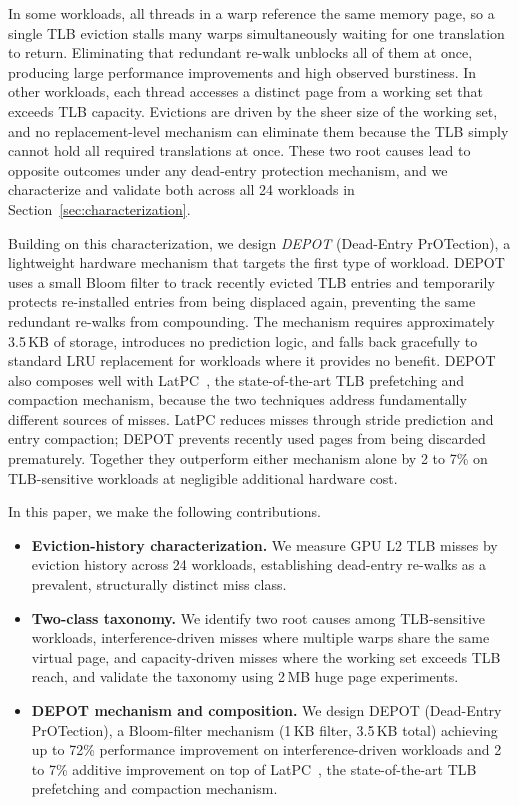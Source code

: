 In some workloads, all threads in a warp reference the same memory page, so a single TLB
eviction stalls many warps simultaneously waiting for one translation to return.
Eliminating that redundant re-walk unblocks all of them at once, producing large performance
improvements and high observed burstiness.
In other workloads, each thread accesses a distinct page from a working set that exceeds
TLB capacity.
Evictions are driven by the sheer size of the working set, and no replacement-level
mechanism can eliminate them because the TLB simply cannot hold all required translations
at once.
These two root causes lead to opposite outcomes under any dead-entry protection mechanism,
and we characterize and validate both across all 24 workloads in Section~\ref{sec:characterization}.

Building on this characterization, we design \emph{DEPOT} (Dead-Entry PrOTection),
a lightweight hardware mechanism that targets the first type of workload.
DEPOT uses a small Bloom filter to track recently evicted TLB entries and temporarily
protects re-installed entries from being displaced again, preventing the same redundant
re-walks from compounding.
The mechanism requires approximately 3.5\,KB of storage, introduces no prediction logic,
and falls back gracefully to standard LRU replacement for workloads where it provides
no benefit.
DEPOT also composes well with LatPC~\cite{latpc}, the state-of-the-art TLB prefetching
and compaction mechanism, because the two techniques address fundamentally different
sources of misses.
LatPC reduces misses through stride prediction and entry compaction; DEPOT prevents
recently used pages from being discarded prematurely.
Together they outperform either mechanism alone by 2 to 7\% on TLB-sensitive workloads
at negligible additional hardware cost.

In this paper, we make the following contributions.
\begin{itemize}
  \item \textbf{Eviction-history characterization.}
    We measure GPU L2 TLB misses by eviction history across 24 workloads,
    establishing dead-entry re-walks as a prevalent, structurally distinct miss class.
  \item \textbf{Two-class taxonomy.}
    We identify two root causes among TLB-sensitive workloads,
    interference-driven misses where multiple warps share the same virtual page,
    and capacity-driven misses where the working set exceeds TLB reach,
    and validate the taxonomy using 2\,MB huge page experiments.
  \item \textbf{DEPOT mechanism and composition.}
    We design DEPOT (Dead-Entry PrOTection), a Bloom-filter mechanism
    (1\,KB filter, 3.5\,KB total)
    achieving up to 72\% performance improvement on interference-driven workloads and
    2 to 7\% additive improvement on top of LatPC~\cite{latpc},
    the state-of-the-art TLB prefetching and compaction mechanism.
\end{itemize}